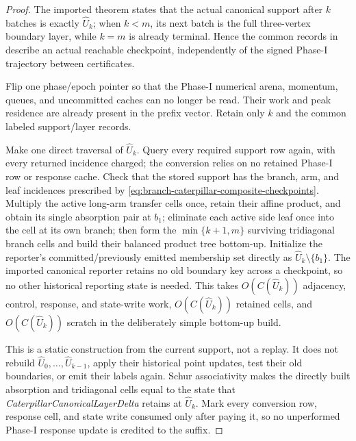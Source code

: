 \begin{proof}
The imported theorem states that the actual canonical support after $k$
batches is exactly $\widehat U_k$; when $k<m$, its next batch is the full
three-vertex boundary layer, while $k=m$ is already terminal.  Hence the
common records in
 describe an actual
reachable checkpoint, independently of the signed Phase-I trajectory between
certificates.

Flip one phase/epoch pointer so that the Phase-I numerical arena, momentum,
queues, and uncommitted caches can no longer be read.  Their work and peak
residence are already present in the prefix vector.  Retain only $k$ and the
common labeled support/layer records.

Make one direct traversal of $\widehat U_k$.  Query every required support row
again, with every returned incidence charged; the conversion relies on no
retained Phase-I row or response cache.  Check that the stored support has the
branch, arm, and leaf incidences prescribed by
\eqref{eq:branch-caterpillar-composite-checkpoints}.  Multiply the active
long-arm transfer cells once, retain their affine product, and obtain its
single absorption pair at $b_1$;
eliminate each active side leaf once into the cell at its own branch; then
form the $\min\{k+1,m\}$ surviving tridiagonal branch cells and build their
balanced product tree bottom-up.  Initialize the reporter's committed/previously
emitted membership set directly as $\widehat U_k\setminus\{b_1\}$.  The
imported canonical reporter retains no old boundary key across a checkpoint,
so no other historical reporting state is needed.  This takes
$O(C(\widehat U_k))$ adjacency, control, response, and state-write work,
$O(C(\widehat U_k))$ retained cells, and $O(C(\widehat U_k))$ scratch in the
deliberately simple bottom-up build.

This is a static construction from the current support, not a replay.  It
does not rebuild $\widehat U_0,\ldots,\widehat U_{k-1}$, apply their historical
point updates, test their old boundaries, or emit their labels again.  Schur
associativity makes the directly built absorption and tridiagonal cells equal
to the state that \emph{CaterpillarCanonicalLayerDelta} retains at
$\widehat U_k$.  Mark every conversion row, response cell, and state write
consumed only after paying it, so no unperformed Phase-I response update is
credited to the suffix.


\end{proof}
